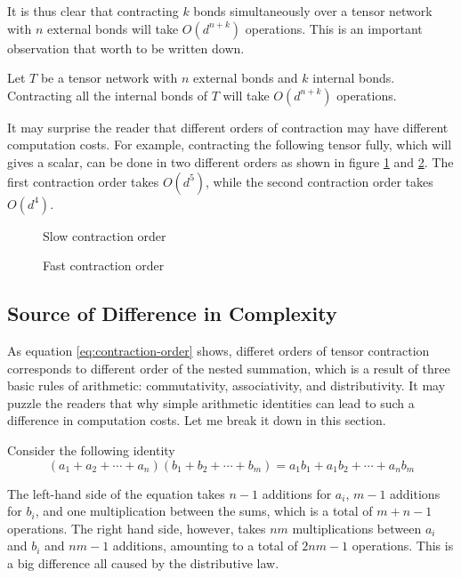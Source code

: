 It is thus clear that contracting $k$ bonds simultaneously over a tensor network with $n$ external bonds will take $O(d^{n+k})$ operations.
This is an important observation that worth to be written down.

\begin{lemma}\label{lem:contraction-complexity}
	Let $T$ be a tensor network with $n$ external bonds and $k$ internal bonds. 
	Contracting all the internal bonds of $T$ will take $O(d^{n+k})$ operations.
\end{lemma}

It may surprise the reader that different orders of contraction may have different computation costs.
For example, contracting the following tensor fully, which will gives a scalar, can be done in two different orders as shown in figure \ref{fig:contract-order-slow} and \ref{fig:contract-order-fast}.
The first contraction order takes $O(d^5)$, while the second contraction order takes $O(d^4)$.

\begin{figure}[ht]
	\centering
	
	\caption{Slow contraction order}
	\label{fig:contract-order-slow}
\end{figure}
\begin{figure}[ht]
	\centering
	
	\caption{Fast contraction order}
	\label{fig:contract-order-fast}
\end{figure}

\subsection{Source of Difference in Complexity}

As equation \eqref{eq:contraction-order} shows, differet orders of tensor contraction corresponds to different order of the nested summation, which is a result of three basic rules of arithmetic: commutativity, associativity, and distributivity.
It may puzzle the readers that why simple arithmetic identities can lead to such a difference in computation costs.
Let me break it down in this section.

Consider the following identity
$$
	(a_1 + a_2 + \cdots + a_n)(b_1 + b_2 + \cdots + b_m) = a_1 b_1 + a_1 b_2 + \cdots + a_n b_m
$$

The left-hand side of the equation takes $n-1$ additions for $a_i$, $m-1$ additions for $b_i$, and one multiplication between the sums, which is a total of $m+n -1$ operations.
The right hand side, however, takes $nm$ multiplications between $a_i$ and $b_i$ and $nm-1$ additions, amounting to a total of $2nm - 1$ operations. 
This is a big difference all caused by the distributive law.

